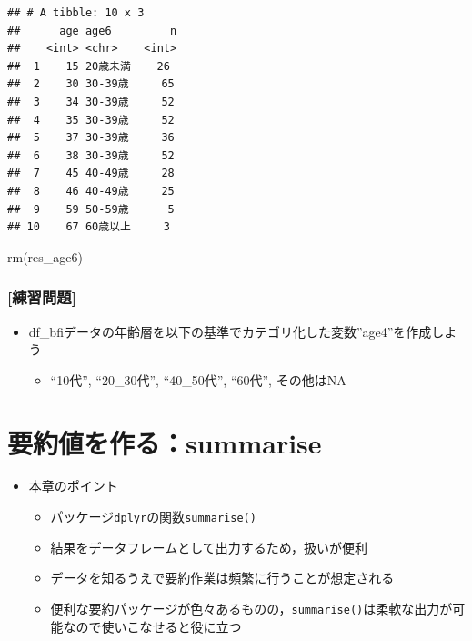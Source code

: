 \documentclass[
  xelatex,ja=standard, b5paper]{bxjsbook}
\newenvironment{Shaded}{\begin{snugshade}}{\end{snugshade}}
\newcommand{\FunctionTok}[1]{\textcolor[rgb]{0.00,0.00,0.00}{#1}}
\newcommand{\NormalTok}[1]{#1}
\providecommand{\tightlist}{%
  \setlength{\itemsep}{0pt}\setlength{\parskip}{0pt}}
\begin{document}
\begin{verbatim}
## # A tibble: 10 x 3
##      age age6         n
##    <int> <chr>    <int>
##  1    15 20歳未満    26
##  2    30 30-39歳     65
##  3    34 30-39歳     52
##  4    35 30-39歳     52
##  5    37 30-39歳     36
##  6    38 30-39歳     52
##  7    45 40-49歳     28
##  8    46 40-49歳     25
##  9    59 50-59歳      5
## 10    67 60歳以上     3
\end{verbatim}

\begin{Shaded}
\begin{Highlighting}[]
\FunctionTok{rm}\NormalTok{(res\_age6)}
\end{Highlighting}
\end{Shaded}

\hypertarget{ux7df4ux7fd2ux554fux984c-14}{%
\subsection{{[}練習問題{]}}\label{ux7df4ux7fd2ux554fux984c-14}}

\begin{itemize}
\tightlist
\item
  df\_bfiデータの年齢層を以下の基準でカテゴリ化した変数''age4''を作成しよう

  \begin{itemize}
  \tightlist
  \item
    ``10代'', ``20\_30代'', ``40\_50代'', ``60代'', その他はNA
  \end{itemize}
\end{itemize}

\hypertarget{summarise}{%
\chapter{要約値を作る：summarise}\label{summarise}}

\begin{itemize}
\tightlist
\item
  本章のポイント

  \begin{itemize}
  \tightlist
  \item
    パッケージ\texttt{dplyr}の関数\texttt{summarise()}
  \item
    結果をデータフレームとして出力するため，扱いが便利
  \item
    データを知るうえで要約作業は頻繁に行うことが想定される
  \item
    便利な要約パッケージが色々あるものの，\texttt{summarise()}は柔軟な出力が可能なので使いこなせると役に立つ
  \end{itemize}
\end{itemize}
\end{document}
